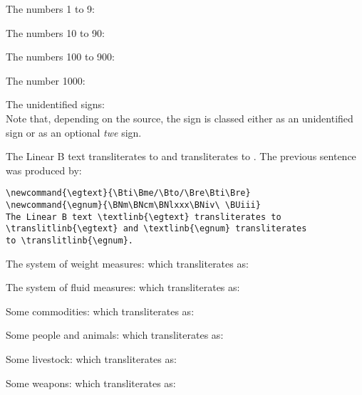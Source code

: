 \documentclass{article}
\begin{document}
    The numbers 1 to 9: \textlinb{\BNi{} \BNii{} \BNiii{} \BNiv{} \BNv{} \BNvi{} \BNvii{} \BNviii{} \BNix}

    The numbers 10 to 90: \textlinb{\BNx{} \BNxx{} \BNxxx{} \BNxl{} \BNl{} \BNlx{} \BNlxx{} \BNlxxx{} \BNxc}

    The numbers 100 to 900: \textlinb{\BNc{} \BNcc{} \BNccc{} \BNcd{} \BNd{} \BNdc{} \BNdcc{} \BNdccc{} \BNcm}

    The number 1000: \textlinb{\BNm}

    The unidentified signs: \textlinb{\BUi\ \BUii\ \BUiii\ \BUiv\ \BUv\ \BUvi\
                                 \BUvii\ \BUviii\ \BUix\ \BUx\ \BUxi} \\
    Note that, depending on the source, the sign \textlinb{\BUxii} is classed 
either as an unidentified sign or as an optional \textit{twe} sign. 


\newcommand{\egtext}{\Bti\Bme/\Bto/\Bre\Bti\Bre}
\newcommand{\egnum}{\BNm\BNcm\BNlxxx\BNiv\ \BUiii}
The Linear B text \textlinb{\egtext} transliterates to
\translitlinb{\egtext} and \textlinb{\egnum} transliterates
to \translitlinb{\egnum}.
The previous sentence was produced by:
\begin{verbatim}
\newcommand{\egtext}{\Bti\Bme/\Bto/\Bre\Bti\Bre}
\newcommand{\egnum}{\BNm\BNcm\BNlxxx\BNiv\ \BUiii}
The Linear B text \textlinb{\egtext} transliterates to
\translitlinb{\egtext} and \textlinb{\egnum} transliterates
to \translitlinb{\egnum}.
\end{verbatim}

\newcommand{\weights}{\BPwta\ \BPwtb\ \BPwtc\ \BPwtd\ \BPtalent}
The system of weight measures: \textlinb{\weights} which transliterates as:
                       \translitlinb{\weights}

\newcommand{\fluids}{\BPvola\ \BPvolb\ \BPvolcd\ \BPvolcf}
The system of fluid measures: \textlinb{\fluids} which transliterates as:
                       \translitlinb{\fluids}

\newcommand{\commodities}{\BPcloth\ \BPwool\ \BPwheat\ \BPbarley\
                         \BPwine\ \BPolive\ \BPbronze\ \BPgold}
Some commodities: \textlinb{\commodities} which transliterates as:
                       \translitlinb{\commodities}

\newcommand{\menhorses}{\BPman\ \BPwoman\ \BPhorse\ \BPfoal}
Some people and animals: \textlinb{\menhorses}  which transliterates as:
                         \translitlinb{\menhorses}

\newcommand{\livestock}{\BPpig\ \BPboar\ \BPsow\
                        \BPox\ \BPbull\ \BPcow\
                        \BPsheep\ \BPram\ \BPewe\
                        \BPgoat\ \BPbilly\ \BPnanny}
Some livestock: \textlinb{\livestock}  which transliterates as:
                         \translitlinb{\livestock}

\newcommand{\weapons}{\BPchariot\ \BPchassis\ \BPwheel\ 
                      \BPsword \BParrow\ \BPspear}
Some weapons: \textlinb{\weapons}  which transliterates as:
                         \translitlinb{\weapons}
\end{document}
